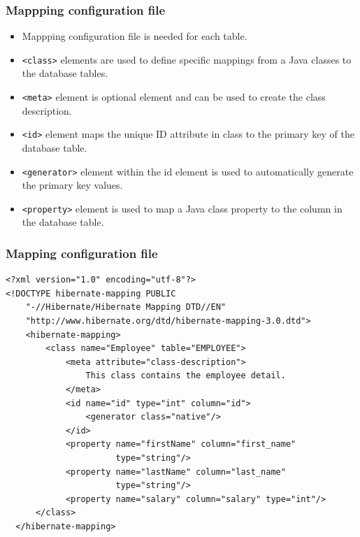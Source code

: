 \documentclass[10pt,xcolor=pdflatex]{beamer}
\begin{document}
\begin{frame}[fragile]\frametitle{Mappping configuration file}
	\begin{itemize}
		\item Mappping configuration file is needed for each table.
        \item \texttt{<class>} elements are used to define specific mappings from a Java classes to the database tables.
        \item \texttt{<meta>} element is optional element and can be used to create the class description.
        \item \texttt{<id>} element maps the unique ID attribute in class to the primary key of the database table.
        \item \texttt{<generator>} element within the id element is used to automatically generate the primary key values.
        \item \texttt{<property>} element is used to map a Java class property to the column in the database table.
	\end{itemize}
\end{frame}


\begin{frame}[fragile]\frametitle{Mapping configuration file}
\lstset{language=XML}
\begin{lstlisting}
<?xml version="1.0" encoding="utf-8"?>
<!DOCTYPE hibernate-mapping PUBLIC
    "-//Hibernate/Hibernate Mapping DTD//EN"
    "http://www.hibernate.org/dtd/hibernate-mapping-3.0.dtd">
    <hibernate-mapping>
        <class name="Employee" table="EMPLOYEE">
            <meta attribute="class-description">
                This class contains the employee detail.
            </meta>
            <id name="id" type="int" column="id">
                <generator class="native"/>
            </id>
            <property name="firstName" column="first_name" 
                      type="string"/>
            <property name="lastName" column="last_name" 
                      type="string"/>
            <property name="salary" column="salary" type="int"/>
      </class>
  </hibernate-mapping>
\end{lstlisting}
\end{frame}
\end{document}
